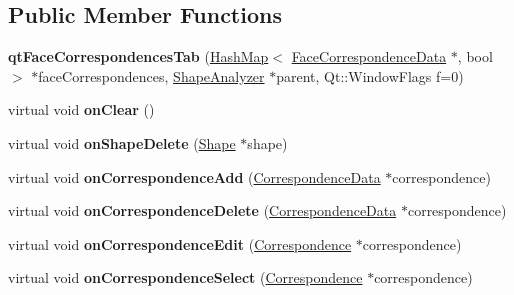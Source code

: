 \subsection*{Public Member Functions}
\begin{DoxyCompactItemize}
\item 
\hypertarget{classqt_face_correspondences_tab_a6d8f996f30a0cbd5de5f159e00438f70}{}{\bfseries qt\+Face\+Correspondences\+Tab} (\hyperlink{class_hash_map}{Hash\+Map}$<$ \hyperlink{class_face_correspondence_data}{Face\+Correspondence\+Data} $\ast$, bool $>$ $\ast$face\+Correspondences, \hyperlink{class_shape_analyzer}{Shape\+Analyzer} $\ast$parent, Qt\+::\+Window\+Flags f=0)\label{classqt_face_correspondences_tab_a6d8f996f30a0cbd5de5f159e00438f70}

\item 
\hypertarget{classqt_face_correspondences_tab_a96fe4ebb18a3969b3576dddfffcaf044}{}virtual void {\bfseries on\+Clear} ()\label{classqt_face_correspondences_tab_a96fe4ebb18a3969b3576dddfffcaf044}

\item 
\hypertarget{classqt_face_correspondences_tab_a6e921225a7049a72fe4b24c355892160}{}virtual void {\bfseries on\+Shape\+Delete} (\hyperlink{class_shape}{Shape} $\ast$shape)\label{classqt_face_correspondences_tab_a6e921225a7049a72fe4b24c355892160}

\item 
\hypertarget{classqt_face_correspondences_tab_ac82e5ba6753e031622ef9441a77a21f1}{}virtual void {\bfseries on\+Correspondence\+Add} (\hyperlink{class_correspondence_data}{Correspondence\+Data} $\ast$correspondence)\label{classqt_face_correspondences_tab_ac82e5ba6753e031622ef9441a77a21f1}

\item 
\hypertarget{classqt_face_correspondences_tab_a6baeb2cd594a9cab17964279b09e4184}{}virtual void {\bfseries on\+Correspondence\+Delete} (\hyperlink{class_correspondence_data}{Correspondence\+Data} $\ast$correspondence)\label{classqt_face_correspondences_tab_a6baeb2cd594a9cab17964279b09e4184}

\item 
\hypertarget{classqt_face_correspondences_tab_a97ea9fe1a2a34f3c8d93e07feb5e244f}{}virtual void {\bfseries on\+Correspondence\+Edit} (\hyperlink{class_correspondence}{Correspondence} $\ast$correspondence)\label{classqt_face_correspondences_tab_a97ea9fe1a2a34f3c8d93e07feb5e244f}

\item 
\hypertarget{classqt_face_correspondences_tab_a80bc8351b1d779799bc8ead3606e2226}{}virtual void {\bfseries on\+Correspondence\+Select} (\hyperlink{class_correspondence}{Correspondence} $\ast$correspondence)\label{classqt_face_correspondences_tab_a80bc8351b1d779799bc8ead3606e2226}


\end{DoxyCompactItemize}
